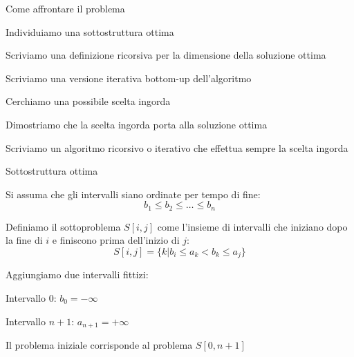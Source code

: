 \begin{frame}{Come affrontare il problema}

\BI
\item Individuiamo una sottostruttura ottima
\item Scriviamo una definizione ricorsiva per la dimensione della soluzione ottima
\item Scriviamo una versione iterativa bottom-up dell'algoritmo
\EI

\BI
\item Cerchiamo una possibile scelta ingorda
\item Dimostriamo che la scelta ingorda porta alla soluzione ottima
\item Scriviamo un algoritmo ricorsivo o iterativo che effettua sempre la scelta ingorda
\EI

\end{frame}

\begin{frame}{Sottostruttura ottima}

\BIL
\item Si assuma che gli intervalli siano ordinate per tempo di fine:\\[-9pt]
\[
	b_1 \leq b_2 \leq \ldots \leq b_n
\]
\item Definiamo il \alert{sottoproblema $S[i,j]$} come l'insieme
di intervalli che iniziano dopo la fine di $i$  e finiscono
prima dell'inizio di $j$:\\[-9pt]
\[
S[i,j] = \{ k |  b_i \leq a_k < b_k \leq a_j \}
\]
\item Aggiungiamo due intervalli fittizi:
\BI
\item Intervallo $0$: $b_0 = -\infty$
\item Intervallo $n+1$: $a_{n+1} = +\infty$
\EI
\item Il problema iniziale corrisponde al problema 
$S[0,n+1]$
\EIL
\begin{center}
\end{center}
\end{frame}

